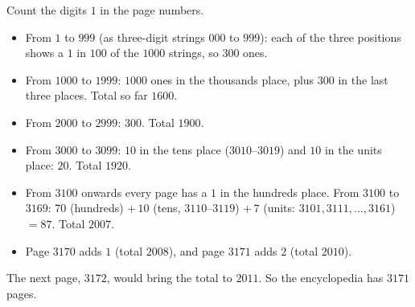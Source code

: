 Count the digits $1$ in the page numbers.
\begin{itemize}
\item From $1$ to $999$ (as three-digit strings $000$ to $999$): each of the three positions shows a $1$ in $100$ of the $1000$ strings, so $300$ ones.
\item From $1000$ to $1999$: $1000$ ones in the thousands place, plus $300$ in the last three places. Total so far $1600$.
\item From $2000$ to $2999$: $300$. Total $1900$.
\item From $3000$ to $3099$: $10$ in the tens place ($3010$--$3019$) and $10$ in the units place: $20$. Total $1920$.
\item From $3100$ onwards every page has a $1$ in the hundreds place. From $3100$ to $3169$: $70$ (hundreds) $+\,10$ (tens, $3110$--$3119$) $+\,7$ (units: $3101,3111,\dots,3161$) $=87$. Total $2007$.
\item Page $3170$ adds $1$ (total $2008$), and page $3171$ adds $2$ (total $2010$).
\end{itemize}
The next page, $3172$, would bring the total to $2011$. So the encyclopedia has $\boxed{3171}$ pages.
